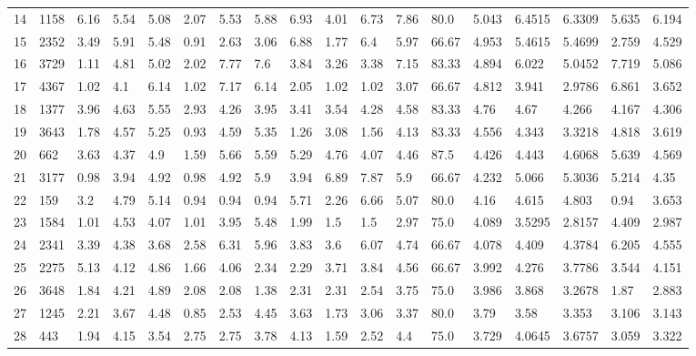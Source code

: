 \documentclass[landscape, 10pt]{report}
\begin{document}
\begin{longtable}{l || l || l | l | l | l | l | l | l | l | l | l | l || l | l | l | l | l}
14 & 1158 & 6.16 & 5.54 & 5.08 & 2.07 & 5.53 & 5.88 & 6.93 & 4.01 & 6.73 & 7.86 & 80.0 & 5.043 & 6.4515 & 6.3309 & 5.635 & 6.194\\ 
\rowcolor{lightgray}15 & 2352 & 3.49 & 5.91 & 5.48 & 0.91 & 2.63 & 3.06 & 6.88 & 1.77 & 6.4 & 5.97 & 66.67 & 4.953 & 5.4615 & 5.4699 & 2.759 & 4.529\\ 
16 & 3729 & 1.11 & 4.81 & 5.02 & 2.02 & 7.77 & 7.6 & 3.84 & 3.26 & 3.38 & 7.15 & 83.33 & 4.894 & 6.022 & 5.0452 & 7.719 & 5.086\\ 
\rowcolor{lightgray}17 & 4367 & 1.02 & 4.1 & 6.14 & 1.02 & 7.17 & 6.14 & 2.05 & 1.02 & 1.02 & 3.07 & 66.67 & 4.812 & 3.941 & 2.9786 & 6.861 & 3.652\\ 
18 & 1377 & 3.96 & 4.63 & 5.55 & 2.93 & 4.26 & 3.95 & 3.41 & 3.54 & 4.28 & 4.58 & 83.33 & 4.76 & 4.67 & 4.266 & 4.167 & 4.306\\ 
\rowcolor{lightgray}19 & 3643 & 1.78 & 4.57 & 5.25 & 0.93 & 4.59 & 5.35 & 1.26 & 3.08 & 1.56 & 4.13 & 83.33 & 4.556 & 4.343 & 3.3218 & 4.818 & 3.619\\ 
20 & 662 & 3.63 & 4.37 & 4.9 & 1.59 & 5.66 & 5.59 & 5.29 & 4.76 & 4.07 & 4.46 & 87.5 & 4.426 & 4.443 & 4.6068 & 5.639 & 4.569\\ 
\rowcolor{lightgray}21 & 3177 & 0.98 & 3.94 & 4.92 & 0.98 & 4.92 & 5.9 & 3.94 & 6.89 & 7.87 & 5.9 & 66.67 & 4.232 & 5.066 & 5.3036 & 5.214 & 4.35\\ 
22 & 159 & 3.2 & 4.79 & 5.14 & 0.94 & 0.94 & 0.94 & 5.71 & 2.26 & 6.66 & 5.07 & 80.0 & 4.16 & 4.615 & 4.803 & 0.94 & 3.653\\ 
\rowcolor{lightgray}23 & 1584 & 1.01 & 4.53 & 4.07 & 1.01 & 3.95 & 5.48 & 1.99 & 1.5 & 1.5 & 2.97 & 75.0 & 4.089 & 3.5295 & 2.8157 & 4.409 & 2.987\\ 
24 & 2341 & 3.39 & 4.38 & 3.68 & 2.58 & 6.31 & 5.96 & 3.83 & 3.6 & 6.07 & 4.74 & 66.67 & 4.078 & 4.409 & 4.3784 & 6.205 & 4.555\\ 
\rowcolor{lightgray}25 & 2275 & 5.13 & 4.12 & 4.86 & 1.66 & 4.06 & 2.34 & 2.29 & 3.71 & 3.84 & 4.56 & 66.67 & 3.992 & 4.276 & 3.7786 & 3.544 & 4.151\\ 
26 & 3648 & 1.84 & 4.21 & 4.89 & 2.08 & 2.08 & 1.38 & 2.31 & 2.31 & 2.54 & 3.75 & 75.0 & 3.986 & 3.868 & 3.2678 & 1.87 & 2.883\\ 
\rowcolor{lightgray}27 & 1245 & 2.21 & 3.67 & 4.48 & 0.85 & 2.53 & 4.45 & 3.63 & 1.73 & 3.06 & 3.37 & 80.0 & 3.79 & 3.58 & 3.353 & 3.106 & 3.143\\ 
28 & 443 & 1.94 & 4.15 & 3.54 & 2.75 & 2.75 & 3.78 & 4.13 & 1.59 & 2.52 & 4.4 & 75.0 & 3.729 & 4.0645 & 3.6757 & 3.059 & 3.322\\ 

\end{longtable}
\end{document}

